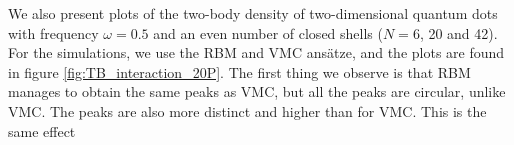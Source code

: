 We also present plots of the two-body density of two-dimensional quantum dots with frequency $\omega=0.5$ and an even number of closed shells ($N=6$, 20 and 42). For the simulations, we use the RBM and VMC ansätze, and the plots are found in figure \eqref{fig:TB_interaction_20P}. The first thing we observe is that RBM manages to obtain the same peaks as VMC, but all the peaks are circular, unlike VMC. The peaks are also more distinct and higher than for VMC. This is the same effect
\begin{landscape}
	\begin{figure}
		\centering
		\captionsetup{width=0.9\hsize}
		\captionsetup[subfigure]{labelformat=empty}
		\hspace{0.1cm}
		

\end{figure}
\end{landscape}
